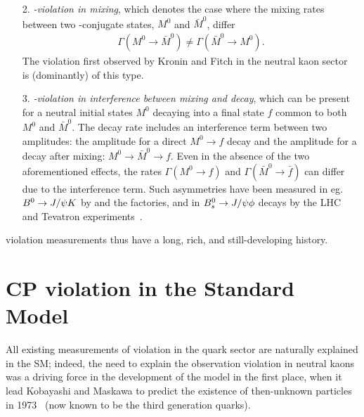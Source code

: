 \begin{enumerate}
    \item[2.] \emph{\CP-violation in mixing}, which denotes the case where the mixing rates between two \CP-conjugate states, $M^0$ and $\bar M^0$, differ
    \begin{align}
        \Gamma (M^0 \to \bar M^0) \neq \Gamma (\bar  M^0 \to M^0).
    \end{align}
    The \CP violation first observed by Kronin and Fitch in the neutral kaon sector~\cite{KroninFitch1964} is (dominantly) of this type. 
    
    \item[3.] \emph{\CP-violation in interference between mixing and decay}, which can be present for a neutral initial states $M^0$ decaying into a final state $f$ common to both $M^0$ and $\bar M^0$. The decay rate includes an interference term between two amplitudes: the amplitude for a direct $M^0\to f$ decay and the amplitude for a decay after mixing: $M^0\to\bar M^0\to f$. Even in the absence of the two aforementioned effects, the rates $\Gamma(M^0\to f)$ and $\Gamma(\bar M^0\to \bar f)$ can differ due to the interference term. Such \CP asymmetries have been measured in eg. ${{B}^0}\rightarrow J/\psi K$ by \lhcb and the \B factories, and in ${{B}^0_{s}}\rightarrow J/\psi \phi$ decays by the LHC and Tevatron experiments~\cite{HFLAV}.
\end{enumerate}
\CP violation measurements thus have a long, rich, and still-developing history.  


\section{CP violation in the Standard Model} %
\label{sec:cp_violation_in_the_standard_model}

All existing measurements of \CP violation in the quark sector are naturally explained in the SM; indeed, the need to explain the observation \CP violation in neutral kaons was a driving force in the development of the model in the first place, when it lead Kobayashi and Maskawa to predict the existence of then-unknown particles in 1973~\cite{kobayashiCPViolationRenormalizableTheory1973} (now known to be the third generation quarks). 

